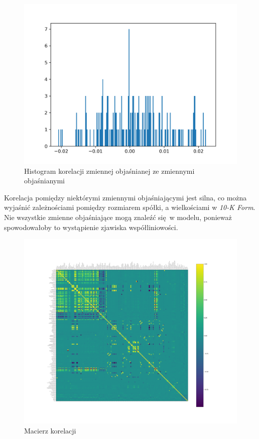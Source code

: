 \documentclass{article}
\begin{document}
\begin{figure}[h!]
    \includegraphics[width=\linewidth]{source/CorrHist.png}
    \caption{Histogram korelacji zmiennej objaśnianej ze zmiennymi objaśnianymi}
\end{figure}

\newpage
Korelacja pomiędzy niektórymi zmiennymi objaśniającymi jest silna, co można wyjaśnić zależnościami pomiędzy rozmiarem spółki, a wielkościami w \textit{10-K Form}. Nie wszystkie zmienne objaśniające mogą znaleźć się w modelu, ponieważ spowodowałoby to wystąpienie zjawiska współliniowości.
\begin{figure}[h!]
    \includegraphics[width=\linewidth]{source/CorrelationMatrix.png}
    \caption{Macierz korelacji}
\end{figure}
\end{document}
